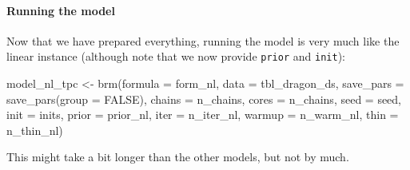 \documentclass[a4paper,12pt,twoside]{article}
\begin{document}
\paragraph{Running the model}
Now that we have prepared everything, running the model is very much like the linear instance (although note that we now provide \texttt{prior} and \texttt{init}):
\begin{Rinput}
model_nl_tpc <-
    brm(formula   = form_nl,
        data      = tbl_dragon_ds,
        save_pars = save_pars(group = FALSE),
        chains    = n_chains,
        cores     = n_chains,
        seed      = seed,
        init      = inits,
        prior     = prior_nl,
        iter      = n_iter_nl,
        warmup    = n_warm_nl,
        thin      = n_thin_nl)
\end{Rinput}
This might take a bit longer than the other models, but not by much.
\end{document}
